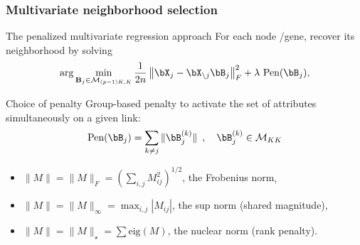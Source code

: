 \begin{frame}
  \frametitle{Multivariate neighborhood selection} 

  \begin{block}{The penalized multivariate regression approach}
    For each node /gene, recover its neighborhood by solving 
    \begin{equation*}
      \arg  \min_{\mathbf{B}_j  \in  \mathcal{M}_{(p-1)K,K}}  \frac{1}{2n} \left\|
        \bX_j - \bX_{\backslash j}\bB_j\right\|_F^2 +
      \lambda \ \text{Pen}(\bB_j),
    \end{equation*}
  \end{block}
  
  \vfill
  
  \begin{block}{Choice of penalty}
    Group-based   penalty   to   activate  the   set   of   attributes
    simultaneously on a given link:
    \begin{equation*}
      \text{Pen}(\bB_j) =       \sum_{k \neq j}  \|\bB_j^{(k)}\|  \enskip  ,
      \quad \bB_j^{(k)} \in \mathcal{M}_{KK}
    \end{equation*}
    \begin{itemize}
    \item  \alert{$\|M\|=   \|M\|_F=\left(  \sum_{i,j}  M_{ij}^2\right)^{1/2}$,
        the Frobenius norm},
    \item  $\|M\|=  \|M\|_\infty=  \max_{i,j}{|M_{ij}|}$, the  sup  norm
      (shared magnitude),
    \item $\|M\|= \|M\|_\star=\sum \mathrm{eig}(M)$, the nuclear norm
      (rank penalty).
    \end{itemize}      
  \end{block}
\end{frame}

